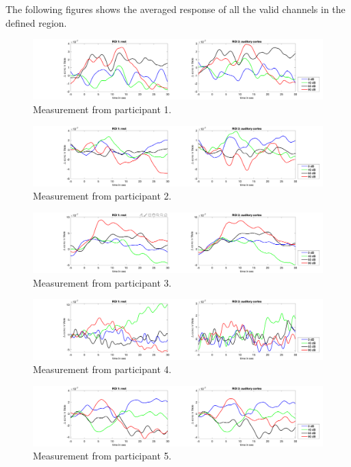 The following figures shows the averaged response of all the valid channels in the defined region.
\begin{figure}[H]
  \centering
    \includegraphics[scale=.29]{bilder/ROI/sub_chang_s_HbO.png}
  \caption{Measurement from participant  1.}
  \label{fig:somesignal}
\end{figure}

\begin{figure}[H]
  \centering
    \includegraphics[scale=.29]{bilder/ROI/sub_gleb2_s_HbO.png}
  \caption{Measurement from participant  2.}
  \label{fig:somesignal}
\end{figure}

\begin{figure}[H]
  \centering
    \includegraphics[scale=.29]{bilder/ROI/sub_jonas_s_HbO.png}
  \caption{Measurement from participant  3.}
  \label{fig:somesignal}
\end{figure}

\begin{figure}[H]
  \centering
    \includegraphics[scale=.29]{bilder/ROI/sub_lin_s_HbO.png}
  \caption{Measurement from participant  4.}
  \label{fig:somesignal}
\end{figure}

\begin{figure}[H]
  \centering
    \includegraphics[scale=.29]{bilder/ROI/sub_lukas_s_HbO.png}
  \caption{Measurement from participant 5.}
  \label{fig:somesignal}
\end{figure}

